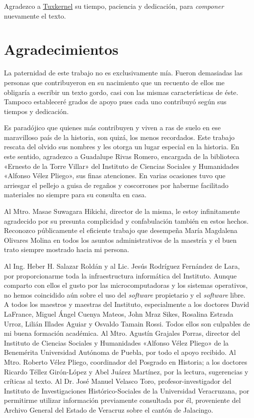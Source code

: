 \documentclass[14pt,twoside,final]{extbook} %
\begin{document}
Agradezco a \href{muxkernel@gmail.com}{Tuxkernel} su tiempo, paciencia y dedicación, para \emph{componer} nuevamente el texto.
\chapter*{Agradecimientos}
\label{ch:agradecimientos}
\thispagestyle{empty}
\pagestyle{fancy}
\fancyhf{} %
\fancyhead[LE,RO]{\thepage}
\renewcommand{\headrulewidth}{0pt}
La paternidad de este trabajo no es exclusivamente mía. Fueron demasiadas las personas que contribuyeron en su nacimiento que un recuento de ellos me obligaría a escribir un texto gordo, casi con las mismas características de éste. Tampoco estableceré grados de apoyo pues cada uno contribuyó según sus tiempos y dedicación.

Es paradójico que quienes más contribuyen y viven a ras de suelo en ese maravilloso país de la historia, son quizá, los menos recordados. Este trabajo rescata del olvido sus nombres y les otorga un lugar especial en la historia. En este sentido, agradezco a Guadalupe Rivas Romero, encargada de la biblioteca «Ernesto de la Torre Villar» del Instituto de Ciencias Sociales y Humanidades «Alfonso Vélez Pliego», sus finas atenciones. En varias ocasiones tuvo que arriesgar el pellejo a guisa de regaños y coscorrones por haberme facilitado materiales no siempre para su consulta en casa.

Al Mtro. Masae Suwagara Hikichi, director de la misma, le estoy infinitamente agradecido por su presunta complicidad y confabulación también en estos hechos. Reconozco públicamente el eficiente trabajo que desempeña María Magdalena Olivares Molina en todos los asuntos administrativos de la maestría y el buen trato siempre mostrado hacia mi persona.

Al Ing. Heber H. Salazar Roldán y al Lic. Jesús Rodríguez Fernández de Lara, por proporcionarme toda la infraestructura informática del Instituto. Aunque comparto con ellos el gusto por las microcomputadoras y los sistemas operativos, no hemos coincidido aún sobre el uso del \emph{software} propietario y el \emph{software} libre. A todos los maestros y maestras del Instituto, especialmente a los doctores David LaFrance, Miguel Ángel Cuenya Mateos, John Mraz Sikes, Rosalina Estrada Urroz, Lilián Illades Aguiar y Osvaldo Tamain Rossi. Todos ellos son culpables de mi buena formación académica. Al Mtro. Agustín Grajales Porras, director del Instituto de Ciencias Sociales y Humanidades «Alfonso Vélez Pliego» de la Benemérita Universidad Autónoma de Puebla, por todo el apoyo recibido. Al Mtro. Roberto Vélez Pliego, coordinador del Posgrado en Historia; a los doctores Ricardo Téllez Girón-López y Abel Juárez Martínez, por la lectura, sugerencias y críticas al texto. Al Dr. José Manuel Velasco Toro, profesor-investigador del Instituto de Investigaciones Histórico-Sociales de la Universidad Veracruzana, por permitirme utilizar información previamente consultada por él, proveniente del Archivo General del Estado de Veracruz sobre el cantón de Jalacingo.
\end{document}
